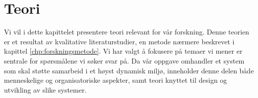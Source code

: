\chapter{Teori}
\label{chp:teori}


Vi vil i dette kapittelet presentere teori relevant for vår forskning. Denne teorien er et resultat av kvalitative literaturstudier, en metode nærmere beskrevet i kapittel \ref{chp:forskningsmetode}. Vi har valgt å fokusere på temaer vi mener er sentrale for spørsmålene vi søker svar på. Da vår oppgave omhandler et system som skal støtte samarbeid i et høyst dynamisk miljø, inneholder denne delen  både menneskelige og organisatoriske aspekter, samt teori knyttet til design og utvikling av slike systemer.
